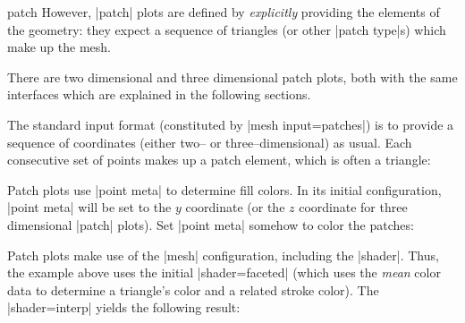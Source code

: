 {\begin{plottype}[/pgfplots]{patch}
	However, |patch| plots are defined by \emph{explicitly} providing the elements of the geometry: they expect a sequence of triangles (or other |patch type|s) which make up the mesh.

	There are two dimensional and three dimensional patch plots, both with the same interfaces which are explained in the following sections.

	The standard input format (constituted by |mesh input=patches|) is to provide a sequence of coordinates (either two-- or three--dimensional) as usual. Each consecutive set of points makes up a patch element, which is often a triangle:
\begin{codeexample}[]
\end{codeexample}
	\noindent Patch plots use |point meta| to determine fill colors. In its initial configuration, |point meta| will be set to the $y$ coordinate (or the $z$ coordinate for three dimensional |patch| plots). Set |point meta| somehow to color the patches:
\begin{codeexample}[]
\end{codeexample}
	Patch plots make use of the |mesh| configuration, including the |shader|. Thus, the example above uses the initial |shader=faceted| (which uses the \emph{mean} color data to determine a triangle's color and a related stroke color). The |shader=interp| yields the following result:
\begin{codeexample}[]
\end{codeexample}
\end{plottype}}
